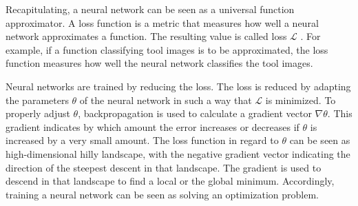 Recapitulating, a neural network can be seen as a universal function approximator.\autocite{Ertel.2016} A loss function is a metric that measures how well a neural network approximates a function. The resulting value is called loss $\mathcal{L}$ \autocite{ElAmir.2020}. For example, if a function classifying tool images is to be approximated, the loss function measures how well the neural network classifies the tool images.
\par
Neural networks are trained by reducing the loss. The loss is reduced by adapting the parameters $\theta$ of the neural network in such a way that $\mathcal{L}$ is minimized. To properly adjust $\theta$, backpropagation \autocite{Rumelhart.1986} is used to calculate a gradient vector $\nabla {\theta}$. This gradient indicates by which amount the error increases or decreases if $\theta$ is increased by a very small amount. The loss function in regard to $\theta$ can be seen as high-dimensional hilly landscape, with the negative gradient vector indicating the direction of the steepest descent in that landscape. The gradient is used to descend in that landscape to find a local or the global minimum. \autocite{LeCun.2015} Accordingly, training a neural network can be seen as solving an optimization problem. \autocite{ElAmir.2020}  